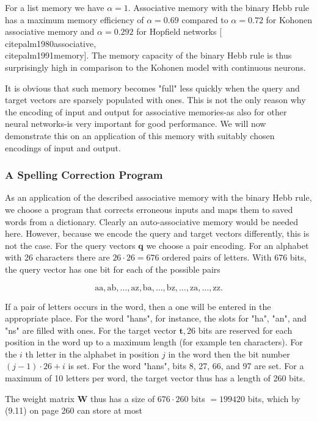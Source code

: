 \documentclass[10pt]{book}
\begin{document}
For a list memory we have $\alpha=1$. Associative memory with the binary Hebb rule has a maximum memory efficiency of $\alpha=0.69$ compared to $\alpha=0.72$ for Kohonen associative memory and $\alpha=0.292$ for Hopfield networks [\\cite{palm1980associative}, \\cite{palm1991memory}]. The memory capacity of the binary Hebb rule is thus surprisingly high in comparison to the Kohonen model with continuous neurons.

It is obvious that such memory becomes "full" less quickly when the query and target vectors are sparsely populated with ones. This is not the only reason why the encoding of input and output for associative memories-as also for other neural networks-is very important for good performance. We will now demonstrate this on an application of this memory with suitably chosen encodings of input and output.

\subsubsection*{A Spelling Correction Program}
As an application of the described associative memory with the binary Hebb rule, we choose a program that corrects erroneous inputs and maps them to saved words from a dictionary. Clearly an auto-associative memory would be needed here. However, because we encode the query and target vectors differently, this is not the case. For the query vectors $\boldsymbol{q}$ we choose a pair encoding. For an alphabet with 26 characters there are $26 \cdot 26=676$ ordered pairs of letters. With 676 bits, the query vector has one bit for each of the possible pairs

$$
\mathrm{aa}, \mathrm{ab}, \ldots, \mathrm{az}, \mathrm{ba}, \ldots, \mathrm{bz}, \ldots, \mathrm{za}, \ldots, \mathrm{zz} .
$$

If a pair of letters occurs in the word, then a one will be entered in the appropriate place. For the word "hans", for instance, the slots for "ha", "an", and "ns" are filled with ones. For the target vector $\boldsymbol{t}, 26$ bits are reserved for each position in the word up to a maximum length (for example ten characters). For the $i$ th letter in the alphabet in position $j$ in the word then the bit number $(j-1) \cdot 26+i$ is set. For the word "hans", bits 8, 27, 66, and 97 are set. For a maximum of 10 letters per word, the target vector thus has a length of 260 bits.

The weight matrix $\boldsymbol{W}$ thus has a size of $676 \cdot 260$ bits $=199420$ bits, which by (9.11) on page 260 can store at most
\end{document}
